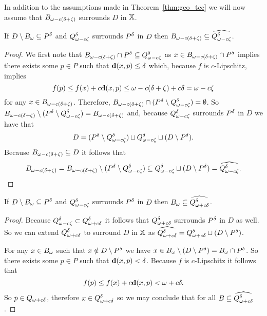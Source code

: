 
In addition to the assumptions made in Theorem~\ref{thm:geo_tcc} we will now assume that $\b$ surrounds $D$ in $\X$.


\begin{lemma}\label{lem:q_contain_1}
  If $D\setminus \B\subseteq \P$ and $\Q^\of$ surrounds $\P$ in $D$ then $\b\subseteq \ext{\Q^\of}$.
\end{lemma}
\begin{proof}
  We first note that $\b\cap \P\subseteq \Q^\of$ as $x\in \b\cap \P$ implies there exists some $p\in P$ such that $\dist(x, p)\leq \of$ which, because $f$ is $c$-Lipschitz, implies
  \[ f(p) \leq f(x) + c\dist(x, p)\leq \o + c\delta = \fen\]
  for any $x\in \b$.
  Therefore, $\b\cap (\P\setminus \Q^\of) = \emptyset$.
  So $\b\setminus (\P\setminus \Q^\of) = \b$ and, because $\Q^\of$ surrounds $\P$ in $D$ we have that
  \[ D = (\P\setminus \Q^\of)\sqcup \Q^\of \sqcup (D\setminus \P).\]
  Because $\b\subseteq D$ it follows that
  \[ \b = \b \setminus (\P\setminus \Q^\of)\subseteq \Q^\of\sqcup (D\setminus \P) = \ext{\Q^\of}. \]
\end{proof}

\begin{lemma}\label{lem:q_contain_2}
  If $D\setminus \B\subseteq \P$ and $\Q^\of$ surrounds $\P$ in $D$ then $\B\subseteq \ext{\QQ^\of}$.
\end{lemma}
\begin{proof}
  Because $\Q^\of \subset \QQ^\of$ it follows that $\QQ^\of$ surrounds $\P$ in $D$ as well.
  So we can extend $\QQ^\of$ to surround $D$ in $\X$ as $\ext{\QQ^\of} = \QQ^\of\sqcup (D\setminus\P)$.

  For any $x\in \B$ such that $x\notin D\setminus\P$ we have $x\in \B\setminus (D\setminus \P) = \B\cap \P$.
  So there exists some $p\in P$ such that $\dist(x, p) < \delta$.
  Because $f$ is $c$-Lipschitz it follows that
  \[ f(p)\leq f(x) + c\dist(x, p) < \omega + c\delta. \]
  So $p\in \QQ$, therefore $x\in \QQ^\delta$ so we may conclude that for all $B\subseteq \ext{\QQ^\delta}$.
\end{proof}

